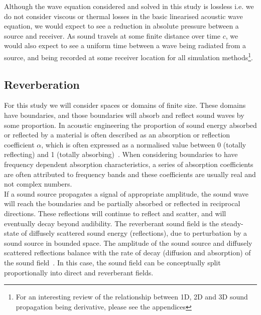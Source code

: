 Although the wave equation considered and solved in this study is lossless i.e. we do not consider viscous or thermal losses in the basic linearised acoustic wave equation, we would expect to see a reduction in absolute pressure between a source and receiver. As sound travels at some finite distance over time $c$, we would also expect to see a uniform time between a wave being radiated from a source, and being recorded at some receiver location for all simulation methods\footnote{For an interesting review of the relationship between 1D, 2D and 3D sound propagation being derivative, please see the appendices}.\\ 

\subsection{Reverberation}
For this study we will consider spaces or domains of finite size. These domains have boundaries, and those boundaries will absorb and reflect sound waves by some proportion. In acoustic engineering the proportion of sound energy absorbed or reflected by a material is often described as an absorption or reflection coefficient $\alpha$, which is often expressed as a normalised value between 0 (totally reflecting) and 1 (totally absorbing)~\cite{beranek1954acoustics}. When considering boundaries to have frequency dependent absorption characteristics, a series of absorption coefficients are often attributed to frequency bands and these coefficients are usually real and not complex numbers.\\

If a sound source propagates a signal of appropriate amplitude, the sound wave will reach the boundaries and be partially absorbed or reflected in reciprocal directions. These reflections will continue to reflect and scatter, and will eventually decay beyond audibility. The reverberant sound field is the steady-state of diffusely scattered sound energy (reflections), due to perturbation by a sound source in bounded space. The amplitude of the sound source and diffusely scattered reflections balance with the rate of decay (diffusion and absorption) of the sound field~\cite{Everest2009}. In this case, the sound field can be conceptually split proportionally into direct and reverberant fields.\\

